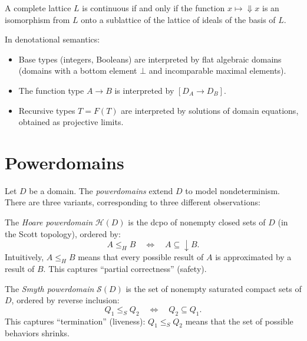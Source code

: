 \begin{theorem}
A complete lattice $L$ is continuous if and only if the function
$x \mapsto {\Downarrow} x$ is an isomorphism from $L$ onto a sublattice of the lattice
of ideals of the basis of $L$.
\end{theorem}

\begin{proposition}
In denotational semantics:
\begin{itemize}
  \item Base types (integers, Booleans) are interpreted by flat algebraic domains (domains
    with a bottom element $\bot$ and incomparable maximal elements).
  \item The function type $A \to B$ is interpreted by $[D_A \to D_B]$.
  \item Recursive types $T = F(T)$ are interpreted by solutions of domain equations,
    obtained as projective limits.
\end{itemize}
\end{proposition}

\section{Powerdomains}

\begin{definition}[Powerdomains]
Let $D$ be a domain. The \emph{powerdomains} extend $D$ to model nondeterminism. There
are three variants, corresponding to three different observations:
\end{definition}

\begin{definition}
The \emph{Hoare powerdomain} $\mathcal{H}(D)$ is the dcpo of nonempty closed sets of $D$
(in the Scott topology), ordered by:
\[
  A \leq_H B \quad \Longleftrightarrow \quad A \subseteq {\downarrow} B.
\]
Intuitively, $A \leq_H B$ means that every possible result of $A$ is approximated by a
result of $B$. This captures ``partial correctness'' (safety).
\end{definition}

\begin{definition}
The \emph{Smyth powerdomain} $\mathcal{S}(D)$ is the set of nonempty saturated compact
sets of $D$, ordered by reverse inclusion:
\[
  Q_1 \leq_S Q_2 \quad \Longleftrightarrow \quad Q_2 \subseteq Q_1.
\]
This captures ``termination'' (liveness): $Q_1 \leq_S Q_2$ means that the set of possible
behaviors shrinks.
\end{definition}

